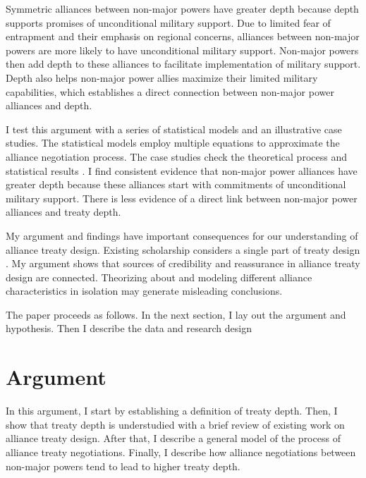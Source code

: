 \documentclass[12pt]{article}
\begin{document}
Symmetric alliances between non-major powers have greater depth because depth supports promises of unconditional military support. 
Due to limited fear of entrapment and their emphasis on regional concerns, alliances between non-major powers are more likely to have unconditional military support. 
Non-major powers then add depth to these alliances to facilitate implementation of military support. %
Depth also helps non-major power allies maximize their limited military capabilities, which establishes a direct connection between non-major power alliances and depth. %


I test this argument with a series of statistical models and an illustrative case studies.
The statistical models employ multiple equations to approximate the alliance negotiation process. 
The case studies check the theoretical process and statistical results \citep{SeawrightGerring2008, Seawright2016}. 
I find consistent evidence that non-major power alliances have greater depth because these alliances start with commitments of unconditional military support. 
There is less evidence of a direct link between non-major power alliances and treaty depth. 


My argument and findings have important consequences for our understanding of alliance treaty design. 
Existing scholarship considers a single part of treaty design \citep{Benson2012, Mattes2012, Chibaetal2015}. 
My argument shows that sources of credibility and reassurance in alliance treaty design are connected. 
Theorizing about and modeling different alliance characteristics in isolation may generate misleading conclusions. 


The paper proceeds as follows. 
In the next section, I lay out the argument and hypothesis. 
Then I describe the data and research design 


\section{Argument}


In this argument, I start by establishing a definition of treaty depth. 
Then, I show that treaty depth is understudied with a brief review of existing work on alliance treaty design. 
After that, I describe a general model of the process of alliance treaty negotiations. 
Finally, I describe how alliance negotiations between non-major powers tend to lead to higher treaty depth. 
\end{document}
